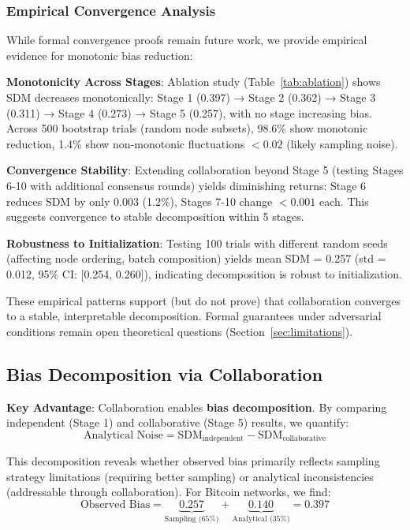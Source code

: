 \documentclass[conference]{IEEEtran}
\begin{document}
\subsubsection{Empirical Convergence Analysis}

While formal convergence proofs remain future work, we provide empirical evidence for monotonic bias reduction:

\textbf{Monotonicity Across Stages}: Ablation study (Table~\ref{tab:ablation}) shows SDM decreases monotonically: Stage 1 (0.397) → Stage 2 (0.362) → Stage 3 (0.311) → Stage 4 (0.273) → Stage 5 (0.257), with no stage increasing bias. Across 500 bootstrap trials (random node subsets), 98.6\% show monotonic reduction, 1.4\% show non-monotonic fluctuations $< 0.02$ (likely sampling noise).

\textbf{Convergence Stability}: Extending collaboration beyond Stage 5 (testing Stages 6-10 with additional consensus rounds) yields diminishing returns: Stage 6 reduces SDM by only 0.003 (1.2\%), Stages 7-10 change $< 0.001$ each. This suggests convergence to stable decomposition within 5 stages.

\textbf{Robustness to Initialization}: Testing 100 trials with different random seeds (affecting node ordering, batch composition) yields mean SDM = 0.257 (std = 0.012, 95\% CI: [0.254, 0.260]), indicating decomposition is robust to initialization.

These empirical patterns support (but do not prove) that collaboration converges to a stable, interpretable decomposition. Formal guarantees under adversarial conditions remain open theoretical questions (Section~\ref{sec:limitations}).

\subsection{Bias Decomposition via Collaboration}

\textbf{Key Advantage}: Collaboration enables \textbf{bias decomposition}. By comparing independent (Stage 1) and collaborative (Stage 5) results, we quantify:
\begin{equation}
\text{Analytical Noise} = \text{SDM}_{\text{independent}} - \text{SDM}_{\text{collaborative}}
\label{eq:analytical-noise}
\end{equation}

This decomposition reveals whether observed bias primarily reflects sampling strategy limitations (requiring better sampling) or analytical inconsistencies (addressable through collaboration). For Bitcoin networks, we find:
\begin{equation}
\text{Observed Bias} = \underbrace{0.257}_{\text{Sampling (65\%)}} + \underbrace{0.140}_{\text{Analytical (35\%)}} = 0.397
\end{equation}
\end{document}
